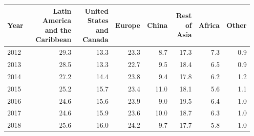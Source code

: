 \begin{tabular}{lrrrrrrr}
\toprule
Year & Latin America and the Caribbean & United States and Canada & Europe & China & Rest of Asia & Africa & Other \\
\midrule
2012 & 29.3 & 13.3 & 23.3 & 8.7 & 17.3 & 7.3 & 0.9 \\
2013 & 28.5 & 13.3 & 22.7 & 9.5 & 18.4 & 6.5 & 0.9 \\
2014 & 27.2 & 14.4 & 23.8 & 9.4 & 17.8 & 6.2 & 1.2 \\
2015 & 25.2 & 15.7 & 23.4 & 11.0 & 18.1 & 5.6 & 1.1 \\
2016 & 24.6 & 15.6 & 23.9 & 9.0 & 19.5 & 6.4 & 1.0 \\
2017 & 24.6 & 15.9 & 23.6 & 10.0 & 18.7 & 6.3 & 1.0 \\
2018 & 25.6 & 16.0 & 24.2 & 9.7 & 17.7 & 5.8 & 1.0 \\
\bottomrule
\end{tabular}
